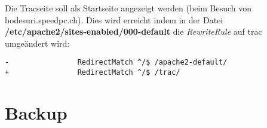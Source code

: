 \documentclass[a4paper,12pt,halfparskip,DIV14]{scrreprt}
\begin{document}
Die Tracseite soll als Startseite angezeigt werden (beim Besuch von bodesuri.speedpc.ch). Dies wird erreicht indem in der Datei \textbf{/etc/apache2/sites-enabled/000-default} die \emph{RewriteRule} auf trac umgeändert wird:

\begin{verbatim}
-                RedirectMatch ^/$ /apache2-default/
+                RedirectMatch ^/$ /trac/
\end{verbatim}

\chapter{Backup} %
\label{cha:backup}

\end{document}
